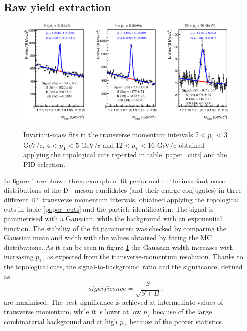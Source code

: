 \documentclass[b5paper,10pt,twoside,oldstyle,classica]{toptesi}
\newcommand{\pt}{p_\text{T}}
\begin{document}
\subsection{Raw yield extraction}
\begin{figure}[b]
\begin{center}
{\includegraphics[scale = 0.65]{MassFit3Bin.eps}}
\caption{Invariant-mass fits in the transverse momentum intervals $2 < \pt < 3$ GeV/c, $4 < \pt < 5$ GeV/c and $12 < \pt < 16$ GeV/c obtained applying the topological cuts reported in table \ref{paper_cuts} and the PID selection.}
\label{massfitex}
\end{center}
\end{figure}
In figure \ref{massfitex} are shown three example of fit performed to the invariant-mass distributions of the D$^+$-meson candidates (and their charge conjugates) in three different D$^+$ transverse momentum intervals, obtained applying the topological cuts in table \ref{paper_cuts} and the particle identification. The signal is parametrised with a Gaussian, while the background with an exponential function. The stability of the fit parameters was checked by comparing the Gaussian mean and width with the values obtained by fitting the MC distributions. As it can be seen in figure \ref{massfitex} the Gaussian width increases with increasing $\pt$, as expected from the transverse-momentum resolution. Thanks to the topological cuts, the signal-to-background ratio and the significance, defined as
\begin{equation}
significance = \frac{S}{\sqrt{S+B}},
\end{equation}
are maximised. The best significance is achieved at intermediate values of transverse momentum, while it is lower at low $\pt$ because of the large combinatorial background and at high $\pt$ because of the poorer statistics.  
\end{document}
